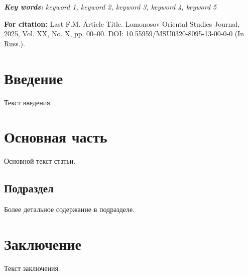 \documentclass[12pt]{article}    %
\newcommand{\keywordsen}[1]{%
    \noindent\textbf{\textit{Key words:}} \textit{#1}%
    \par\vspace{0.5em}%
}
\newcommand{\fundingen}[1]{%
    \noindent\textbf{Funding:} #1%
    \par\vspace{0.5em}%
}
\newcommand{\citationen}[1]{%
    \noindent\textbf{For citation:} #1%
    \par\vspace{1em}%
}
\begin{document}
\keywordsen{keyword 1, keyword 2, keyword 3, keyword 4, keyword 5}


\citationen{Last F.M. Article Title. Lomonosov Oriental Studies Journal, 2025, Vol. XX, No. X, pp. 00--00. DOI: 10.55959/MSU0320-8095-13-00-0-0 (In Russ.).}

\vspace{1em}


\section{Введение}

Текст введения.

\section{Основная часть}

Основной текст статьи.

\subsection{Подраздел}

Более детальное содержание в подразделе.

\section{Заключение}

Текст заключения.


\end{document}
